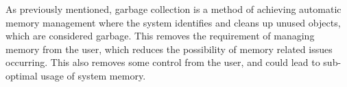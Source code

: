 As previously mentioned, garbage collection is a method of achieving automatic memory management where the system identifies and cleans up unused objects, which are considered garbage. This removes the requirement of managing memory from the user, which reduces the possibility of memory related issues occurring. This also removes some control from the user, and could lead to sub-optimal usage of system memory.

